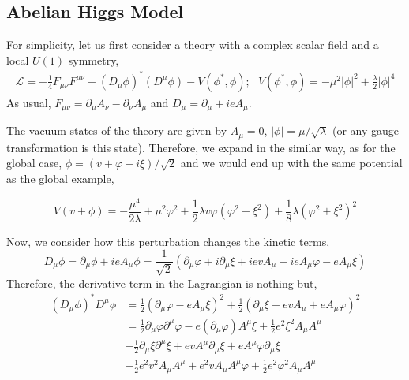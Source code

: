 \subsection{Abelian Higgs Model}
For simplicity, let us first consider a theory with a complex scalar field and a local $U(1)$ symmetry, 
\begin{equation}
    \begin{split}
        \mathcal{L} = -\frac{1}{4}F_{\mu\nu}F^{\mu\nu} + (D_{\mu}\phi)^*(D^{\mu}\phi) - V(\phi^*, \phi); \ \ \ V(\phi^*,\phi) = -\mu^2|\phi|^2 +\frac{\lambda}{2}|\phi|^4
    \end{split}
\end{equation}
As usual, $F_{\mu\nu} = \partial_{\mu}A_{\nu}-\partial_{\nu}A_{\mu}$ and $D_{\mu}=\partial_{\mu} + ieA_{\mu}$.

The vacuum states of the theory are given by $A_{\mu}=0$, $|\phi| = \mu/\sqrt{\lambda}$ (or any gauge transformation is this state). Therefore, we expand in the similar way, as for the global case, $\phi = (v + \varphi + i\xi)/\sqrt{2}$ and we would end up with the same potential as the global example,

\begin{equation}
    V(v + \phi)=-\frac{\mu^4}{2\lambda} + \mu^2\varphi^2 + \frac{1}{2}\lambda v\varphi\left(\varphi^2 + \xi^2\right)
    + \frac{1}{8}\lambda\left(\varphi^2 + \xi^2\right)^2
\end{equation}

Now, we consider how this perturbation changes the kinetic terms, 
\begin{equation}
    D_{\mu}\phi = \partial_{\mu}\phi + ieA_{\mu}\phi = \frac{1}{\sqrt{2}}\left(\partial_{\mu}\varphi + i\partial_{\mu}\xi + ievA_{\mu} +ieA_{\mu}\varphi - eA_{\mu}\xi \right)
\end{equation}
Therefore, the derivative term in the Lagrangian is nothing but, 
\begin{equation}
\begin{split}
    (D_{\mu}\phi)^*D^{\mu}\phi &= \frac{1}{2}(\partial_{\mu}\varphi-eA_{\mu}\xi)^2 + \frac{1}{2}\left(\partial_{\mu}\xi + evA_{\mu} +eA_{\mu}\varphi\right)^2\\
    &= \frac{1}{2}\partial_{\mu}\varphi\partial^{\mu}\varphi - e\left(\partial_{\mu}\varphi\right)A^{\mu}\xi + \frac{1}{2}e^2\xi^2A_{\mu}A^{\mu}\\
    &+ \frac{1}{2}\partial_{\mu}\xi\partial^{\mu}\xi + evA^{\mu}\partial_{\mu}\xi + eA^{\mu}\varphi\partial_{\mu}\xi\\
    &+ \frac{1}{2}e^2v^2A_{\mu}A^{\mu} + e^2vA_{\mu}A^{\mu}\varphi + \frac{1}{2}e^2\varphi^2A_{\mu}A^{\mu}
\end{split}
\end{equation}


